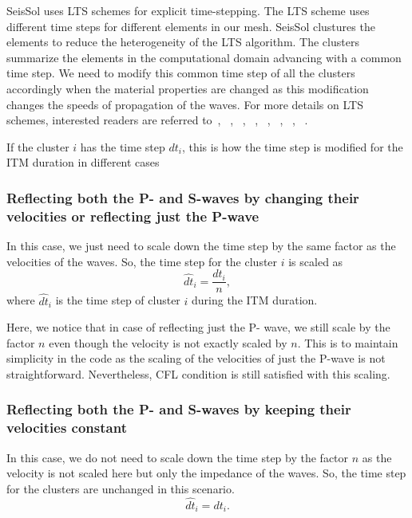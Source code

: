 SeisSol uses \ac{LTS} schemes for explicit time-stepping. The \ac{LTS} scheme uses different time steps for different elements in our mesh. 
SeisSol clustures the elements to reduce the heterogeneity of the \ac{LTS} algorithm. The clusters summarize the elements in the computational domain advancing
with a common time step. We need to modify this common time step of all the clusters accordingly when the material properties are changed as this modification changes the 
speeds of propagation of the waves. For more details on \ac{LTS} schemes, interested readers are referred to~\parencite{breuer}, ~\parencite{dumbser2007arbitrary},
~\parencite{castro2009space}, ~\parencite{rietmann2015loadbalanced}, ~\parencite{seny2014efficient}, ~\parencite{Gassner2008}, ~\parencite{andrew}, 
~\parencite{SCHLEGEL2009345}.

If the cluster $i$ has the time step $dt_i$, this is how the time step is modified for the \ac{ITM} duration in different cases

\subsubsection{Reflecting both the P- and S-waves by changing their velocities or reflecting just the P-wave}
In this case, we just need to scale down the time step by the same factor as the velocities of the waves. So, the time step for the cluster $i$ is scaled as
\begin{equation}
    \hat{dt}_i = \frac{dt_i}{n} ,
\end{equation}
where $\hat{dt}_i$ is the time step of cluster $i$ during the \ac{ITM} duration. 

Here, we notice that in case of reflecting just the P- wave, we still scale by the factor $n$ even though the velocity is not exactly scaled by $n$. This is
to maintain simplicity in the code as the scaling of the velocities of just the P-wave is not straightforward. Nevertheless, \ac{CFL} condition is still 
satisfied with this scaling. 

\subsubsection{Reflecting both the P- and S-waves by keeping their velocities constant}
In this case, we do not need to scale down the time step by the factor $n$ as the velocity is not scaled here but only the impedance of the waves. 
So, the time step for the clusters are unchanged in this scenario.
\begin{equation}
    \hat{dt}_i = dt_i .
\end{equation}
